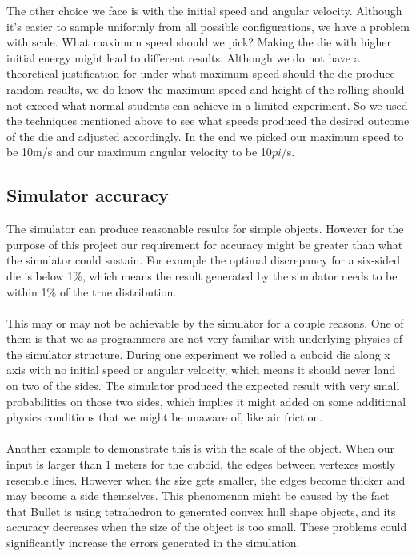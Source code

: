 The other choice we face is with the initial speed and angular velocity. Although it's easier to sample uniformly from all possible configurations, we have a problem with scale. What maximum speed should we pick? Making the die with higher initial energy might lead to different results. Although we do not have a theoretical justification for under what maximum speed should the die produce random results, we do know the maximum speed and height of the rolling should not exceed what normal students can achieve in a limited experiment. So we used the techniques mentioned above to see what speeds produced the desired outcome of the die and adjusted accordingly. In the end we picked our maximum speed to be 10m/s and our maximum angular velocity to be 10${pi}$/s.

\subsection{Simulator accuracy}
The simulator can produce reasonable results for simple objects. However for the purpose of this project our requirement for accuracy might be greater than what the simulator could sustain. For example the optimal discrepancy for a six-sided die is below 1\%, which means the result generated by the simulator needs to be within 1\% of the true distribution.\\\\
This may or may not be achievable by the simulator for a couple reasons. One of them is that we as programmers are not very familiar with underlying physics of the simulator structure. During one experiment we rolled a cuboid die along x axis with no initial speed or angular velocity, which means it should never land on two of the sides. The simulator produced the expected result with very small probabilities on those two sides, which implies it might added on some additional physics conditions that we might be unaware of, like air friction.\\\\
Another example to demonstrate this is with the scale of the object. When our input is larger than 1 meters for the cuboid, the edges between vertexes mostly resemble lines. However when the size gets smaller, the edges become thicker and may become a side themselves. This phenomenon might be caused by the fact that Bullet is using tetrahedron to generated convex hull shape objects, and its accuracy decreases when the size of the object is too small. These problems could significantly increase the errors generated in the simulation.
